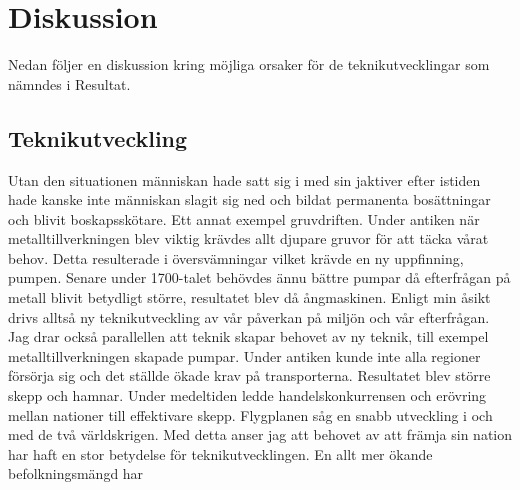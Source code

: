 \section{Diskussion}
Nedan följer en diskussion kring möjliga orsaker för de teknikutvecklingar som nämndes i Resultat. 

\subsection{Teknikutveckling}
Utan den situationen människan hade satt sig i med sin jaktiver efter istiden hade kanske inte människan slagit sig ned och bildat permanenta bosättningar och blivit boskapsskötare. Ett annat exempel gruvdriften. Under antiken när metalltillverkningen blev viktig krävdes allt djupare gruvor för att täcka vårat behov. Detta resulterade i översvämningar vilket krävde en ny uppfinning, pumpen. Senare under 1700-talet behövdes ännu bättre pumpar då efterfrågan på metall blivit betydligt större, resultatet blev då ångmaskinen. Enligt min åsikt drivs alltså ny teknikutveckling av vår påverkan på miljön och vår efterfrågan. Jag drar också parallellen att teknik skapar behovet av ny teknik, till exempel metalltillverkningen skapade pumpar. 
\newline
\newline
Under antiken kunde inte alla regioner försörja sig och det ställde ökade krav på transporterna. Resultatet blev större skepp och hamnar. Under medeltiden ledde handelskonkurrensen och erövring mellan nationer till effektivare skepp. Flygplanen såg en snabb utveckling i och med de två världskrigen. Med detta anser jag att behovet av att främja sin nation har haft en stor betydelse för teknikutvecklingen. 
\newline
\newline
En allt mer ökande befolkningsmängd har 
